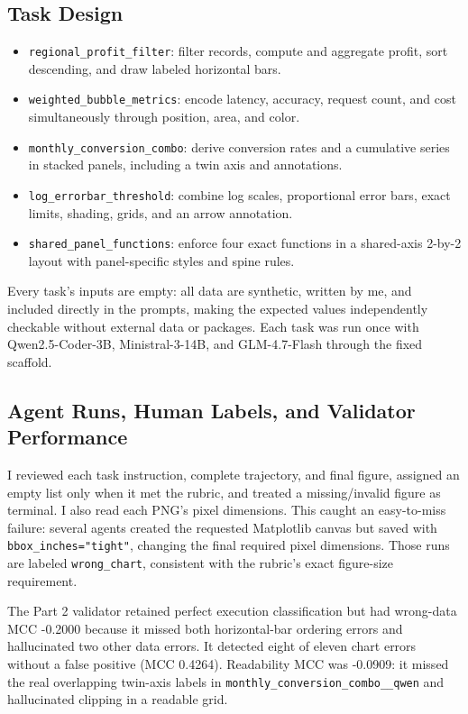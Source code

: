 \documentclass[11pt]{article}
\begin{document}
\subsection{Task Design}
\begin{itemize}
  \item \texttt{regional\_profit\_filter}: filter records, compute and aggregate
  profit, sort descending, and draw labeled horizontal bars.
  \item \texttt{weighted\_bubble\_metrics}: encode latency, accuracy, request
  count, and cost simultaneously through position, area, and color.
  \item \texttt{monthly\_conversion\_combo}: derive conversion rates and a
  cumulative series in stacked panels, including a twin axis and annotations.
  \item \texttt{log\_errorbar\_threshold}: combine log scales, proportional
  error bars, exact limits, shading, grids, and an arrow annotation.
  \item \texttt{shared\_panel\_functions}: enforce four exact functions in a
  shared-axis 2-by-2 layout with panel-specific styles and spine rules.
\end{itemize}
Every task's inputs are empty: all data are synthetic, written by me, and included directly in the prompts, making the
expected values independently checkable without external data or packages.
Each task was run once with Qwen2.5-Coder-3B, Ministral-3-14B, and
GLM-4.7-Flash through the fixed scaffold.

\subsection{Agent Runs, Human Labels, and Validator Performance}
I reviewed each task instruction, complete trajectory, and final figure,
assigned an empty list only when it met the rubric, and treated a
missing/invalid figure as terminal. I also read each PNG's pixel dimensions.
This caught an easy-to-miss failure: several agents created the requested
Matplotlib canvas but saved with \texttt{bbox\_inches="tight"}, changing the
final required pixel dimensions. Those runs are labeled \texttt{wrong\_chart},
consistent with the rubric's exact figure-size requirement.

The Part 2 validator retained perfect execution classification but had
wrong-data MCC -0.2000 because it missed both horizontal-bar ordering errors
and hallucinated two other data errors. It detected eight of eleven chart
errors without a false positive (MCC 0.4264). Readability MCC was -0.0909: it
missed the real overlapping twin-axis labels in
\texttt{monthly\_conversion\_combo\_\_qwen} and hallucinated clipping in a
readable grid.
\end{document}
